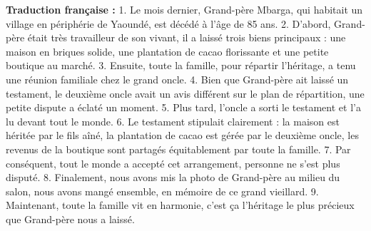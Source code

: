 \documentclass[11pt]{article}
\begin{document}
\begin{exoresolu}
\par
\textbf{Traduction française :}
1. Le mois dernier, Grand-père Mbarga, qui habitait un village en périphérie de Yaoundé, est décédé à l'âge de 85 ans. 
2. D'abord, Grand-père était très travailleur de son vivant, il a laissé trois biens principaux : une maison en briques solide, une plantation de cacao florissante et une petite boutique au marché. 
3. Ensuite, toute la famille, pour répartir l'héritage, a tenu une réunion familiale chez le grand oncle. 
4. Bien que Grand-père ait laissé un testament, le deuxième oncle avait un avis différent sur le plan de répartition, une petite dispute a éclaté un moment. 
5. Plus tard, l'oncle a sorti le testament et l'a lu devant tout le monde. 
6. Le testament stipulait clairement : la maison est héritée par le fils aîné, la plantation de cacao est gérée par le deuxième oncle, les revenus de la boutique sont partagés équitablement par toute la famille. 
7. Par conséquent, tout le monde a accepté cet arrangement, personne ne s'est plus disputé. 
8. Finalement, nous avons mis la photo de Grand-père au milieu du salon, nous avons mangé ensemble, en mémoire de ce grand vieillard. 
9. Maintenant, toute la famille vit en harmonie, c'est ça l'héritage le plus précieux que Grand-père nous a laissé.


\end{exoresolu}
\end{document}
